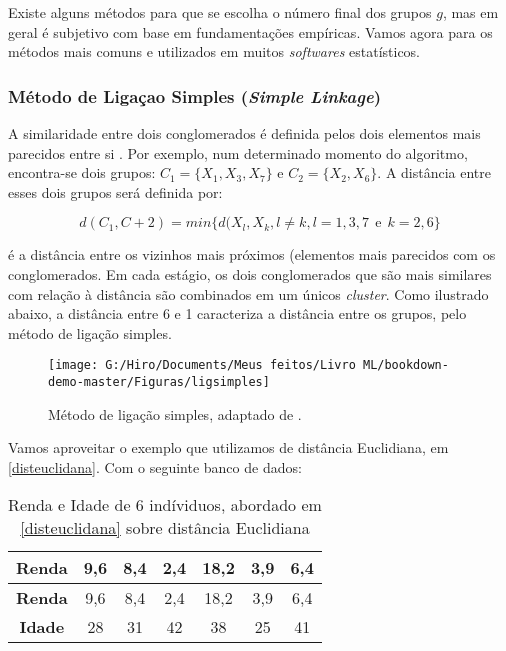 \documentclass[
  openany]{book}
\begin{document}
Existe alguns métodos para que se escolha o número final dos grupos \(g\), mas em geral é subjetivo com base em fundamentações empíricas. Vamos agora para os métodos mais comuns e utilizados em muitos \emph{softwares} estatísticos.

\hypertarget{muxe9todo-de-ligauxe7ao-simples-simple-linkage}{%
\subsubsection{\texorpdfstring{Método de Ligaçao Simples (\emph{Simple Linkage})}{Método de Ligaçao Simples (Simple Linkage)}}\label{muxe9todo-de-ligauxe7ao-simples-simple-linkage}}

A similaridade entre dois conglomerados é definida pelos dois elementos mais parecidos entre si \citep{sneath1957application}. Por exemplo, num determinado momento do algoritmo, encontra-se dois grupos: \(C_1=\{X_1,X_3,X_7\}\) e \(C_2=\{X_2,X_6\}\). A distância entre esses dois grupos será definida por:

\begin{equation}
    d(C_1,C+2)=min\{d(X_l,X_k, l\neq k, l=1,3,7 \ \ \mbox{e} \ \ k=2,6\}
    \label{eq:ligsimples}
\end{equation}

é a distância entre os vizinhos mais próximos (elementos mais parecidos com os conglomerados. Em cada estágio, os dois conglomerados que são mais similares com relação à distância são combinados em um únicos \emph{cluster}. Como ilustrado abaixo, a distância entre 6 e 1 caracteriza a distância entre os grupos, pelo método de ligação simples.

\begin{figure}

{\centering \texttt{[image: G:/Hiro/Documents/Meus feitos/Livro ML/bookdown-demo-master/Figuras/ligsimples]} 

}

\caption{Método de ligação simples, adaptado de \citet{mingoti2007analise}.}\label{fig:ligsimples}
\end{figure}



Vamos aproveitar o exemplo que utilizamos de distância Euclidiana, em \ref{disteuclidana}. Com o seguinte banco de dados:

\begin{longtable}[]{@{}ccccccc@{}}
\caption{\label{tab:dadossrenda} Renda e Idade de 6 indíviduos, abordado em \ref{disteuclidana} sobre distância Euclidiana \citep{mingoti2007analise}}\tabularnewline
\toprule
\textbf{Renda} & 9,6 & 8,4 & 2,4 & 18,2 & 3,9 & 6,4\tabularnewline
\midrule
\endfirsthead
\toprule
\textbf{Renda} & 9,6 & 8,4 & 2,4 & 18,2 & 3,9 & 6,4\tabularnewline
\midrule
\endhead
\textbf{Idade} & 28 & 31 & 42 & 38 & 25 & 41\tabularnewline
\bottomrule
\end{longtable}
\end{document}
